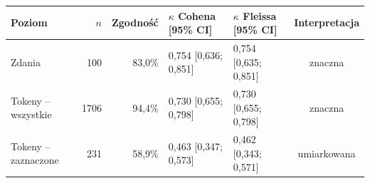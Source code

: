 \begin{tabular}{lrrllc}
\toprule
Poziom & $n$ & Zgodność & $\kappa$ Cohena [95\% CI] & $\kappa$ Fleissa [95\% CI] & Interpretacja \\
\midrule
Zdania & 100 & 83{,}0\% & 0{,}754 [0{,}636; 0{,}851] & 0{,}754 [0{,}635; 0{,}851] & znaczna \\
Tokeny -- wszystkie & 1706 & 94{,}4\% & 0{,}730 [0{,}655; 0{,}798] & 0{,}730 [0{,}655; 0{,}798] & znaczna \\
Tokeny -- zaznaczone & 231 & 58{,}9\% & 0{,}463 [0{,}347; 0{,}573] & 0{,}462 [0{,}343; 0{,}571] & umiarkowana \\
\bottomrule
\end{tabular}
